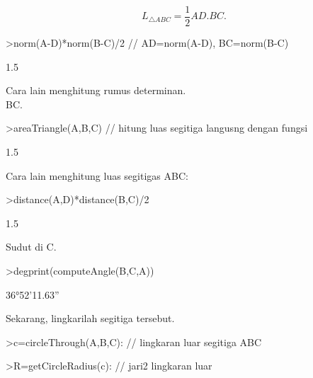 \documentclass[12pt,Times new roman,letterpaper]{book}
\begin{document}
\begin{eulernootebook}
\begin{eulercomment}
\begin{eulercomment}
\begin{eulernootebook}
\begin{eulercomment}
\begin{eulercomment}
\begin{eulercomment}
\begin{eulercomment}
\begin{eulercomment}
\begin{eulercomment}
\begin{eulernotebook}
\begin{eulercomment}
\begin{eulercomment}
\end{eulercomment}
\begin{eulerformula}
\[
L_{\triangle ABC}= \frac{1}{2}AD.BC.
\]
\end{eulerformula}
\begin{eulerprompt}
>norm(A-D)*norm(B-C)/2 // AD=norm(A-D), BC=norm(B-C)
\end{eulerprompt}
\begin{euleroutput}
  1.5
\end{euleroutput}
\begin{eulercomment}
Cara lain menghitung rumus determinan.\\
BC.
\end{eulercomment}
\begin{eulerprompt}
>areaTriangle(A,B,C) // hitung luas segitiga langusng dengan fungsi
\end{eulerprompt}
\begin{euleroutput}
  1.5
\end{euleroutput}
\begin{eulercomment}
Cara lain menghitung luas segitigas ABC:
\end{eulercomment}
\begin{eulerprompt}
>distance(A,D)*distance(B,C)/2
\end{eulerprompt}
\begin{euleroutput}
  1.5
\end{euleroutput}
\begin{eulercomment}
Sudut di C.
\end{eulercomment}
\begin{eulerprompt}
>degprint(computeAngle(B,C,A))
\end{eulerprompt}
\begin{euleroutput}
  36°52'11.63''
\end{euleroutput}
\begin{eulercomment}
Sekarang, lingkarilah segitiga tersebut.
\end{eulercomment}
\begin{eulerprompt}
>c=circleThrough(A,B,C): // lingkaran luar segitiga ABC
\end{eulerprompt}
\begin{eulerprompt}
>R=getCircleRadius(c): // jari2 lingkaran luar 
\end{eulerprompt}
\begin{eulerprompt}

\end{eulerprompt}
\end{eulercomment}
\end{eulernotebook}
\end{eulercomment}
\end{eulercomment}
\end{eulercomment}
\end{eulercomment}
\end{eulercomment}
\end{eulercomment}
\end{eulernootebook}
\end{eulercomment}
\end{eulercomment}
\end{eulernootebook}
\end{document}
